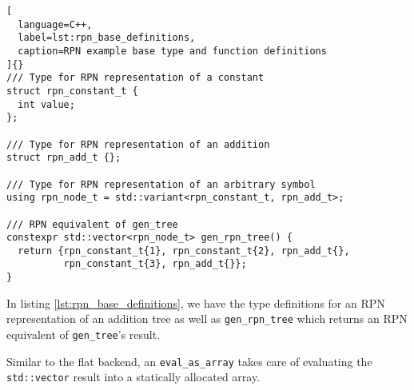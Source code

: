 \documentclass[../main]{subfiles}
\begin{document}
\begin{lstlisting}[
  language=C++,
  label=lst:rpn_base_definitions,
  caption=RPN example base type and function definitions
]{}
/// Type for RPN representation of a constant
struct rpn_constant_t {
  int value;
};

/// Type for RPN representation of an addition
struct rpn_add_t {};

/// Type for RPN representation of an arbitrary symbol
using rpn_node_t = std::variant<rpn_constant_t, rpn_add_t>;

/// RPN equivalent of gen_tree
constexpr std::vector<rpn_node_t> gen_rpn_tree() {
  return {rpn_constant_t{1}, rpn_constant_t{2}, rpn_add_t{},
          rpn_constant_t{3}, rpn_add_t{}};
}
\end{lstlisting}

In listing \ref{lst:rpn_base_definitions}, we have the type definitions for an
RPN representation of an addition tree as well as \lstinline{gen_rpn_tree} which
returns an RPN equivalent of \lstinline{gen_tree}'s result.

Similar to the flat backend, an \lstinline{eval_as_array} takes care
of evaluating the \lstinline{std::vector} result into a statically
allocated array.
\end{document}
